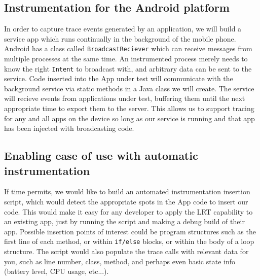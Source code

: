 \subsection{Instrumentation for the Android platform}
In order to capture trace events generated by an application, we will build
a service app which runs continually in the background of the mobile phone.
Android has a class called \texttt{BroadcastReciever} which can receive messages
from multiple processes at the same time. An instrumented process merely needs
to know the right \texttt{Intent} to broadcast with, and arbitrary data can be
sent to the service. Code inserted into the App under test will communicate with the
background service via static methods in a Java class we will create.
The service will recieve events from applications under test, buffering them until the
next appropriate time to export them to the server. This allows us to support 
tracing for any and all apps on the device so long as our service is running and 
that app has been injected with broadcasting code.

\subsection{Enabling ease of use with automatic instrumentation}
If time permits, we would like to build an automated instrumentation insertion 
script, which would detect the appropriate spots in the App code to insert our 
code. This would make it easy for any developer to apply the LRT capability to
an existing app, just by running the script and making a debug build of their 
app. Possible insertion points of interest could be program structures such as the first
line of each method, or within \texttt{if/else} blocks, or within the body of
a loop structure. The script would also populate the trace calls with relevant data
for you, such as line number, class, method, and perhaps even basic state info (battery
level, CPU usage, etc...).


